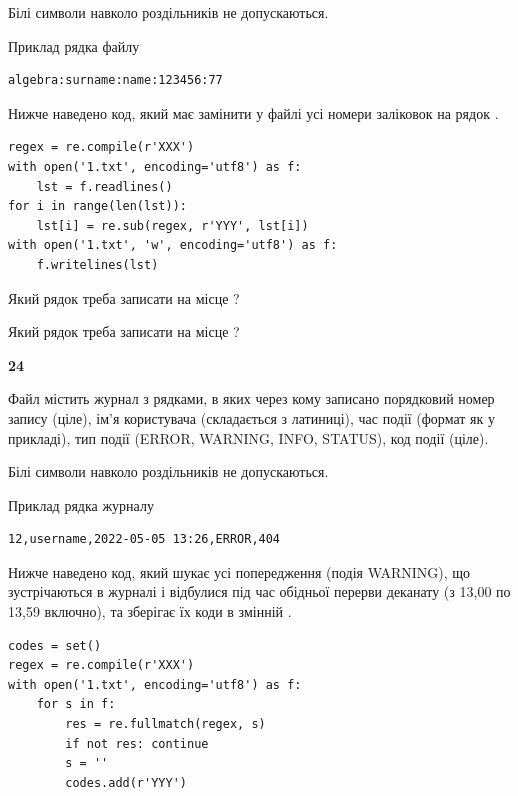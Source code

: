 Білі символи навколо роздільників не допускаються.

Приклад рядка файлу



\begin{verbatim}
algebra:surname:name:123456:77
\end{verbatim}


Нижче наведено код, який має замінити у файлі усі номери заліковок на рядок \code{***}.



\begin{verbatim}
regex = re.compile(r'XXX')
with open('1.txt', encoding='utf8') as f:
    lst = f.readlines()
for i in range(len(lst)):
    lst[i] = re.sub(regex, r'YYY', lst[i])
with open('1.txt', 'w', encoding='utf8') as f:
    f.writelines(lst)
\end{verbatim}







Який рядок треба записати на місце  ?\par
\vspace{5mm}


Який рядок треба записати на місце  ?\par


\newpage

{\begin {center}\textbf{ 24}\end {center}}\par
Файл  містить журнал з рядками, в яких через кому записано поряд\-ко\-вий номер запису (ціле), ім'я користувача (складається з латиниці), час події (фор\-мат як у прикладі), тип події (ERROR, WARNING, INFO, STATUS), код події (ціле).

Білі символи навколо роздільників не допускаються.

Приклад рядка журналу



\begin{verbatim}
12,username,2022-05-05 13:26,ERROR,404
\end{verbatim}


Нижче наведено код, який шукає усі попередження (подія WARNING), що зустрі\-ча\-ються в журналі і відбулися під час обідньої перерви деканату (з 13,00 по 13,59 включно), та зберігає їх коди в змінній .



\begin{verbatim}
codes = set()
regex = re.compile(r'XXX')
with open('1.txt', encoding='utf8') as f:
    for s in f:
        res = re.fullmatch(regex, s)
        if not res: continue
        s = ''
        codes.add(r'YYY')
\end{verbatim}







